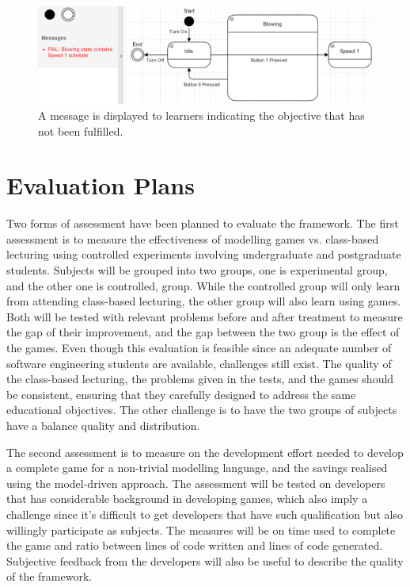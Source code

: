 \documentclass[conference]{IEEEtran}
\begin{document}
\begin{figure}[th]
\centering
\includegraphics[width=\linewidth]{example-fail-messages}
\caption{A message is displayed to learners indicating the objective that has not been fulfilled.}
\label{example-fail-messages}
\end{figure}  

\section{Evaluation Plans}
\label{Evaluation Plans}
Two forms of assessment have been planned to evaluate the framework. The first assessment is to measure the effectiveness of modelling games vs. class-based lecturing using controlled experiments involving undergraduate and postgraduate students. Subjects will be grouped into two groups, one is experimental group, and the other one is controlled, group. While the controlled group will only learn from attending class-based lecturing, the other group will also learn using games. Both will be tested with relevant problems before and after treatment to measure the gap of their improvement, and the gap between the two group is the effect of the games. Even though this evaluation is feasible since an adequate number of software engineering students are available, challenges still exist. The quality of the class-based lecturing, the problems given in the tests, and the games should be consistent, ensuring that they carefully designed to address the same educational objectives. The other challenge is to have the two groups of subjects have a balance quality and distribution. 
  
The second assessment is to measure on the development effort needed to develop a complete game for a non-trivial modelling language, and the savings realised using the model-driven approach. The assessment will be tested on developers that has considerable background in developing games, which also imply a challenge since it's difficult to get developers that have such qualification but also willingly participate as subjects. The measures will be on time used to complete the game and ratio between lines of code written and lines of code generated. Subjective feedback from the developers will also be useful to describe the quality of the framework.  
  
\end{document}
